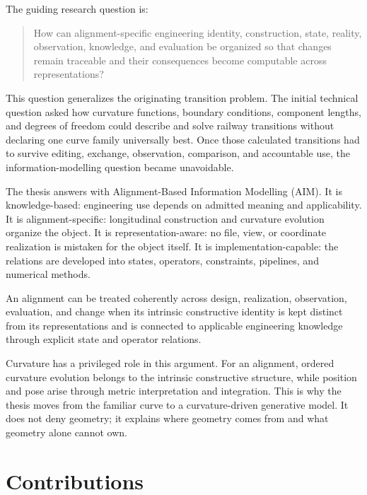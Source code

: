 The guiding research question is:

\begin{quote}
How can alignment-specific engineering identity, construction, state, reality,
observation, knowledge, and evaluation be organized so that changes remain
traceable and their consequences become computable across representations?
\end{quote}

This question generalizes the originating transition problem. The initial
technical question asked how curvature functions, boundary conditions,
component lengths, and degrees of freedom could describe and solve railway
transitions without declaring one curve family universally best. Once those
calculated transitions had to survive editing, exchange, observation,
comparison, and accountable use, the information-modelling question became
unavoidable.

The thesis answers with Alignment-Based Information Modelling (AIM). It is
knowledge-based: engineering use depends on admitted meaning and applicability.
It is alignment-specific: longitudinal construction and curvature evolution
organize the object. It is representation-aware: no file, view, or coordinate
realization is mistaken for the object itself. It is implementation-capable:
the relations are developed into states, operators, constraints, pipelines, and
numerical methods.

\begin{proposition}
An alignment can be treated coherently across design, realization,
observation, evaluation, and change when its intrinsic constructive identity is
kept distinct from its representations and is connected to applicable
engineering knowledge through explicit state and operator relations.
\end{proposition}

Curvature has a privileged role in this argument. For an alignment, ordered
curvature evolution belongs to the intrinsic constructive structure, while
position and pose arise through metric interpretation and integration. This is
why the thesis moves from the familiar curve to a curvature-driven generative
model. It does not deny geometry; it explains where geometry comes from and
what geometry alone cannot own.

\section{Contributions}

